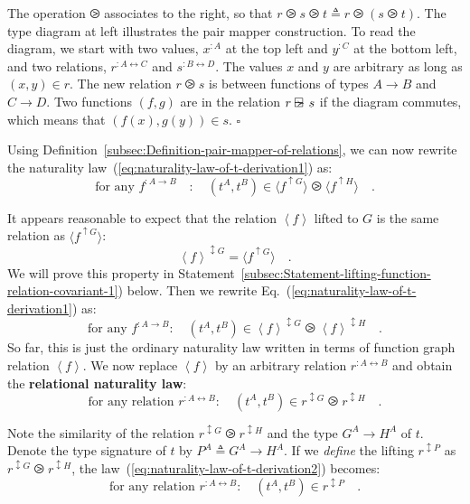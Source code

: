 \noindent The operation $\ogreaterthan$ associates to the right,
so that $r\ogreaterthan s\ogreaterthan t\triangleq r\ogreaterthan\left(s\ogreaterthan t\right)$.
The type diagram at left illustrates the pair mapper construction.
To read the diagram, we start with two values, $x^{:A}$ at the top
left and $y^{:C}$ at the bottom left, and two relations, $r^{:A\leftrightarrow C}$
and $s^{:B\leftrightarrow D}$. The values $x$ and $y$ are arbitrary
as long as $(x,y)\in r$. The new relation $r\ogreaterthan s$ is
between functions of types $A\rightarrow B$ and $C\rightarrow D$.
Two functions $\left(f,g\right)$ are in the relation $r\varogreaterthan s$
if the diagram commutes, which means that $(f(x),g(y))\in s$. $\square$

Using Definition~\ref{subsec:Definition-pair-mapper-of-relations},
we can now rewrite the naturality law~(\ref{eq:naturality-law-of-t-derivation1})
as:
\[
\text{for any }f^{:A\rightarrow B}\quad:\quad(t^{A},t^{B})\in\langle f^{\uparrow G}\rangle\ogreaterthan\langle f^{\uparrow H}\rangle\quad.
\]

It appears reasonable to expect that the relation $\left<f\right>$
lifted to $G$ is the same relation as $\langle f^{\uparrow G}\rangle$:
\[
\left<f\right>^{\updownarrow G}=\langle f^{\uparrow G}\rangle\quad.
\]
We will prove this property in Statement~\ref{subsec:Statement-lifting-function-relation-covariant-1})
below. Then we rewrite Eq.~(\ref{eq:naturality-law-of-t-derivation1})
as:
\[
\text{for any }f^{:A\rightarrow B}:\quad(t^{A},t^{B})\in\left<f\right>^{\updownarrow G}\ogreaterthan\left<f\right>^{\updownarrow H}\quad.
\]
So far, this is just the ordinary naturality law written in terms
of function graph relation $\left<f\right>$. We now replace $\left<f\right>$
by an arbitrary relation $r^{:A\leftrightarrow B}$ and obtain the
\textbf{relational naturality law}:
\begin{equation}
\text{for any relation }r^{:A\leftrightarrow B}:\quad(t^{A},t^{B})\in r^{\updownarrow G}\ogreaterthan r^{\updownarrow H}\quad.\label{eq:naturality-law-of-t-derivation2}
\end{equation}

Note the similarity of the relation $r^{\updownarrow G}\ogreaterthan r^{\updownarrow H}$
and the type $G^{A}\rightarrow H^{A}$ of $t$. Denote the type signature
of $t$ by $P^{A}\triangleq G^{A}\rightarrow H^{A}$. If we \emph{define}
the lifting $r^{\updownarrow P}$ as $r^{\updownarrow G}\ogreaterthan r^{\updownarrow H}$,
the law~(\ref{eq:naturality-law-of-t-derivation2}) becomes:
\begin{equation}
\text{for any relation }r^{:A\leftrightarrow B}:\quad(t^{A},t^{B})\in r^{\updownarrow P}\quad.\label{eq:naturality-law-of-t-derivation3}
\end{equation}

